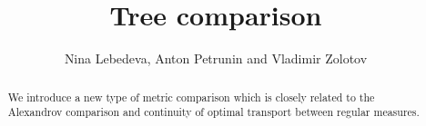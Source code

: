 \documentclass{article}
\begin{document}
\title{Tree comparison}
\author{Nina Lebedeva, Anton Petrunin and Vladimir Zolotov}


\newcommand{\Addresses}{{\bigskip\footnotesize
Anton Petrunin, \par\nopagebreak\textsc{Department of Mathematics, PSU, University Park, PA 16802, USA}
\par\nopagebreak
\textit{Email}: \texttt{petrunin@math.psu.edu}

\medskip
 
...
}}


\date{}

\maketitle

\begin{abstract}
We introduce a new type of metric comparison which is closely related to the Alexandrov comparison and continuity of optimal transport between regular measures. 
\end{abstract}








\end{document}
